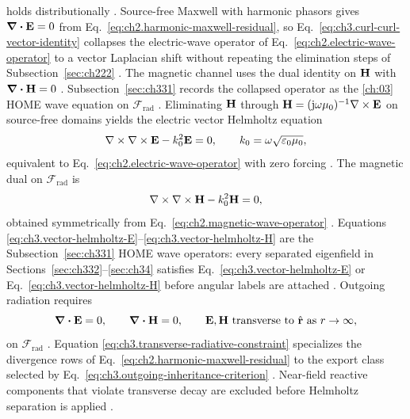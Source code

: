 holds distributionally \cite{stratton1941}. Source-free Maxwell with harmonic phasors gives
\(\div\mathbf{E}=0\) from Eq.~\eqref{eq:ch2.harmonic-maxwell-residual}, so Eq.~\eqref{eq:ch3.curl-curl-vector-identity}
collapses the electric-wave operator of Eq.~\eqref{eq:ch2.electric-wave-operator} to a vector Laplacian shift
without repeating the elimination steps of Subsection~\ref{sec:ch222} \cite{stratton1941}. The magnetic channel
uses the dual identity on \(\mathbf{H}\) with \(\div\mathbf{H}=0\) \cite{jackson1999}. Subsection~\ref{sec:ch331} records the
collapsed operator as the \ref{ch:03} HOME wave equation on \(\mathcal{F}_{\mathrm{rad}}\)
\cite{hansen1988}.
Eliminating \(\mathbf{H}\) through \(\mathbf{H}=(\mathrm{j}\omega\mu_0)^{-1}\nabla\times\mathbf{E}\) on source-free domains yields the electric vector
Helmholtz equation
\begin{equation}
\label{eq:ch3.vector-helmholtz-E}
\nabla\times\nabla\times\mathbf{E}-k_0^{2}\mathbf{E}=0,
\qquad
k_0=\omega\sqrt{\varepsilon_0\mu_0},
\end{equation}
equivalent to Eq.~\eqref{eq:ch2.electric-wave-operator} with zero forcing \cite{stratton1941}.
The magnetic dual on \(\mathcal{F}_{\mathrm{rad}}\) is
\begin{equation}
\label{eq:ch3.vector-helmholtz-H}
\nabla\times\nabla\times\mathbf{H}-k_0^{2}\mathbf{H}=0,
\end{equation}
obtained symmetrically from Eq.~\eqref{eq:ch2.magnetic-wave-operator} \cite{stratton1941}. Equations
\eqref{eq:ch3.vector-helmholtz-E}--\eqref{eq:ch3.vector-helmholtz-H} are the Subsection~\ref{sec:ch331} HOME
wave operators: every separated eigenfield in Sections~\ref{sec:ch332}--\ref{sec:ch34} satisfies
Eq.~\eqref{eq:ch3.vector-helmholtz-E} or Eq.~\eqref{eq:ch3.vector-helmholtz-H} before angular labels are
attached \cite{hansen1988}.
Outgoing radiation requires
\begin{equation}
\label{eq:ch3.transverse-radiative-constraint}
\div\mathbf{E}=0,
\qquad
\div\mathbf{H}=0,
\qquad
\mathbf{E},\mathbf{H}\ \text{transverse to }\hat{\mathbf{r}}\ \text{as }r\to\infty,
\end{equation}
on \(\mathcal{F}_{\mathrm{rad}}\) \cite{stratton1941}. Equation
\eqref{eq:ch3.transverse-radiative-constraint} specializes the divergence rows of
Eq.~\eqref{eq:ch2.harmonic-maxwell-residual} to the export class selected by
Eq.~\eqref{eq:ch3.outgoing-inheritance-criterion} \cite{harrington2001}. Near-field reactive components that
violate transverse decay are excluded before Helmholtz separation is applied \cite{stratton1941}.
